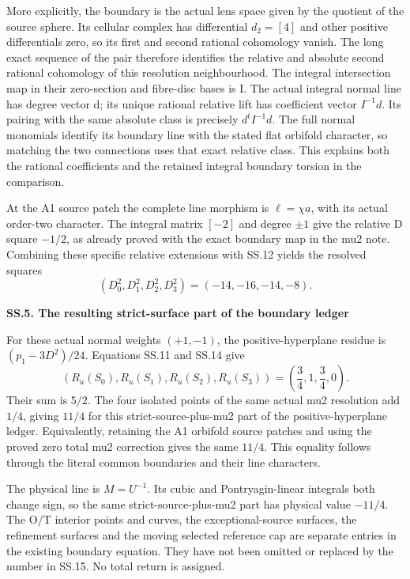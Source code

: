 More explicitly, the boundary is the actual lens space
given by the quotient of the source sphere. Its cellular
complex has differential \(d_2=[4]\) and other positive
differentials zero, so its first and second rational
cohomology vanish. The long exact sequence of the pair
therefore identifies the relative and absolute second
rational cohomology of this resolution neighbourhood.
The integral intersection map in their zero-section and
fibre-disc bases is I. The actual integral normal line
has degree vector d; its unique rational relative lift
has coefficient vector \(I^{-1}d\). Its pairing with
the same absolute class is precisely
\(d^tI^{-1}d\). The full normal monomials identify its
boundary line with the stated flat orbifold character,
so matching the two connections uses that exact relative
class. This explains both the rational coefficients and
the retained integral boundary torsion in the comparison.

At the A1 source patch the complete line morphism is
\(\ell=\chi a\), with its actual order-two character.
The integral matrix \([-2]\) and degree \(\pm1\)
give the relative D square \(-1/2\), as already
proved with the exact boundary map in the mu2 note.
Combining these specific relative extensions with
SS.12 yields the resolved squares
\[
 (D_0^2,D_1^2,D_2^2,D_3^2)=(-14,-16,-14,-8).
 \tag{SS.14}
\]

\par

\medskip\noindent\textbf{SS.5. The resulting strict-surface part of the boundary ledger}

\par\nobreak

For these actual normal weights \((+1,-1)\), the
positive-hyperplane residue is
\((p_1-3D^2)/24\). Equations SS.11 and SS.14 give
\[
 (R_u(S_0),R_u(S_1),R_u(S_2),R_u(S_3))
       =\left(\frac34,1,\frac34,0\right).
 \tag{SS.15}
\]
Their sum is \(5/2\). The four isolated points of the
same actual mu2 resolution add \(1/4\), giving
\(11/4\) for this strict-source-plus-mu2 part of the
positive-hyperplane ledger. Equivalently, retaining
the A1 orbifold source patches and using the proved
zero total mu2 correction gives the same \(11/4\).
This equality follows through the literal common
boundaries and their line characters.

The physical line is \(M=U^{-1}\). Its cubic and
Pontryagin-linear integrals both change sign, so the
same strict-source-plus-mu2 part has physical value
\(-11/4\). The O/T interior points and curves,
the exceptional-source surfaces, the refinement
surfaces and the moving selected reference cap
are separate entries in the existing boundary
equation. They have not been omitted or replaced
by the number in SS.15. No total return is assigned.

